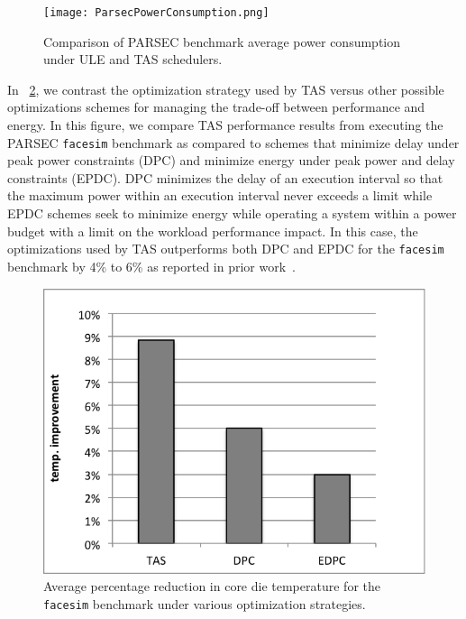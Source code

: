 \documentclass[times, 10pt,twocolumn]{IEEEtran}
\begin{document}
\newline
\begin{figure}[!tbp]
  \texttt{[image: ParsecPowerConsumption.png]}
  \caption{Comparison of PARSEC benchmark average power consumption under ULE and TAS schedulers.}
  \label{fig:pbenchmark}
\end{figure}
In \figurename~\ref{fig:tasvsedp}, we contrast the optimization strategy
used by TAS versus other possible optimizations schemes for managing the
trade-off between performance and energy.  In this figure, we compare
TAS performance results from executing the PARSEC
\texttt{facesim} benchmark as compared to schemes that minimize delay
under peak power constraints (DPC) and minimize energy under peak power and
delay constraints (EPDC). DPC minimizes the delay of an execution
interval so that the maximum power within an execution interval never
exceeds a limit while EPDC schemes seek to minimize energy while
operating a system within a power budget with a limit on the workload
performance impact. In this case, the optimizations used by TAS
outperforms both DPC and EPDC for the \texttt{facesim} 
benchmark by 4\% to 6\%  as reported in prior work~\cite{Cochran2011}. 

\newline
\begin{figure}[!tbhp]
  \centering
\includegraphics[scale=0.6]{graphics/tasvsedpc}
  \caption{Average percentage reduction in core die temperature for the
    \texttt{facesim} benchmark under various optimization strategies.}
  \label{fig:tasvsedp}
\end{figure}
\end{document}
